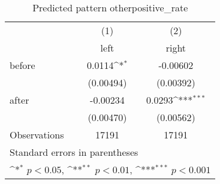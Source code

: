 \begin{table}[htbp]\centering
\def\sym#1{\ifmmode^{#1}\else\(^{#1}\)\fi}
\caption{Predicted pattern otherpositive\_rate}
\begin{tabular}{l*{2}{c}}
\hline\hline
                    &\multicolumn{1}{c}{(1)}&\multicolumn{1}{c}{(2)}\\
                    &\multicolumn{1}{c}{left}&\multicolumn{1}{c}{right}\\
\hline
before              &      0.0114\sym{*}  &    -0.00602         \\
                    &   (0.00494)         &   (0.00392)         \\
[1em]
after               &    -0.00234         &      0.0293\sym{***}\\
                    &   (0.00470)         &   (0.00562)         \\
\hline
Observations        &       17191         &       17191         \\
\hline\hline
\multicolumn{3}{l}{\footnotesize Standard errors in parentheses}\\
\multicolumn{3}{l}{\footnotesize \sym{*} \(p<0.05\), \sym{**} \(p<0.01\), \sym{***} \(p<0.001\)}\\
\end{tabular}
\end{table}

